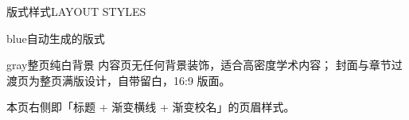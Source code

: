 \documentclass[10pt,aspectratio=169]{beamer}
\begin{document}
\begin{frame}{版式样式}{LAYOUT STYLES}
  \vspace{1mm}
  \begin{minipage}[t]{0.48\textwidth}
    \vspace{0pt}%
    \begin{zjubox}{blue}{自动生成的版式}
      {\small
      }
    \end{zjubox}
  \end{minipage}\hfill
  \begin{minipage}[t]{0.48\textwidth}
    \vspace{0pt}%
  \end{minipage}
  \vspace{1.2mm}
  \begin{zjubox}{gray}{整页纯白背景}
    {\small 内容页无任何背景装饰，适合高密度学术内容；
    封面与章节过渡页为整页满版设计，自带留白，16:9 版面。}
  \end{zjubox}
  \begin{takeaway}
    本页右侧即「标题 + 渐变横线 + 渐变校名」的页眉样式。
  \end{takeaway}
\end{frame}
\end{document}
